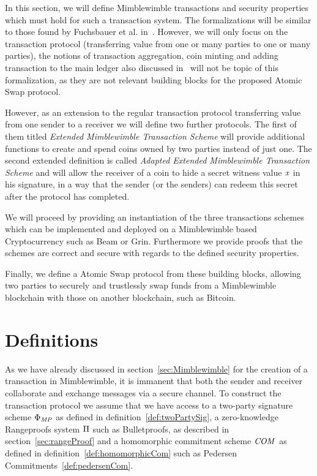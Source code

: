In this section, we will define Mimblewimble transactions and security properties which must hold for such a transaction system. The formalizations will be similar to those found by Fuchsbauer et al. in~\cite{fuchsbauer2019aggregate}. However, we will only focus on the transaction protocol
(transferring value from one or many parties to one or many parties), the notions of transaction aggregation, coin minting and adding transaction to the main ledger also discussed in~\cite{fuchsbauer2019aggregate} will not be topic of this formalization, as
they are not relevant building blocks for the proposed Atomic Swap protocol.

However, as an extension to the regular transaction protocol transferring value from one sender to a receiver we will define two further protocols. The first of them titled \emph{Extended Mimblewimble Transaction Scheme}
will provide additional functions to create and spend coins owned by two parties instead of just one. The second extended definition is called \emph{Adapted Extended Mimblewimble Transaction Scheme} and will allow the receiver
of a coin to hide a secret witness value $\mathit{x}$ in his signature, in a way that the sender (or the senders) can redeem this secret after the protocol has completed.

We will proceed by providing an instantiation of the three transactions schemes which can be implemented and deployed on a Mimblewimble based Cryptocurrency such as Beam or Grin. Furthermore we provide proofs
that the schemes are correct and secure with regards to the defined security properties.

Finally, we define a Atomic Swap protocol from these building blocks, allowing two parties to securely and trustlessly swap funds from a Mimblewimble blockchain with those on another blockchain, such as Bitcoin.


\section{Definitions}\label{sec:atomic-def}

As we have already discussed in section~\ref{sec:Mimblewimble} for the creation of a transaction in Mimblewimble, it is immanent that both the sender and receiver collaborate and exchange messages via a secure channel.
To construct the transaction protocol we assume that we have access to a two-party signature scheme $\Phi_{\mathit{MP}}$ as defined in definition~\ref{def:twoPartySig}, a zero-knowledge Rangeproofs system $\Pi$
such as Bulletproofs, as described in section~\ref{sec:rangeProof} and a homomorphic commitment scheme $\mathit{COM}$ as defined in definition~\ref{def:homomorphicCom} such as
Pedersen Commitments~\ref{def:pedersenCom}.

